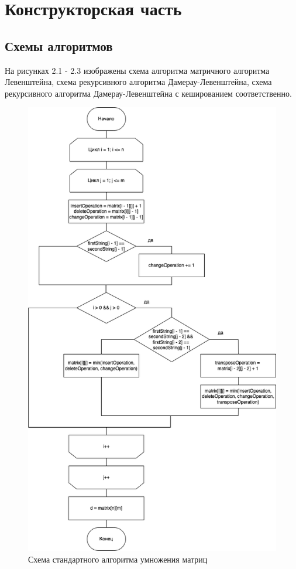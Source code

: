 \chapter{Конструкторская часть}

\section*{Схемы алгоритмов}

На рисунках 2.1 - 2.3 изображены схема алгоритма матричного алгоритма Левенштейна, схема рекурсивного алгоритма Дамерау-Левенштейна, схема рекурсивного алгоритма Дамерау-Левенштейна с кешированием соответственно.


\begin{figure}[ht!]
	\centering
	\includegraphics[width=0.83\linewidth]{img/dl_iter.png}
	\caption{Схема стандартного алгоритма умножения матриц}
	\label{fig:mpr}
\end{figure}

